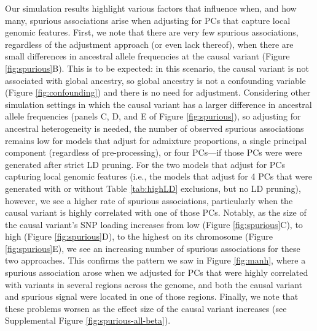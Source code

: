 \documentclass[12pt]{article}
\begin{document}
Our simulation results highlight various factors that influence when, and how many, spurious associations arise when adjusting for PCs that capture local genomic features.
First, we note that there are very few spurious associations, regardless of the adjustment approach (or even lack thereof), when there are small differences in ancestral allele frequencies at the causal variant (Figure \ref{fig:spurious}B). 
This is to be expected: in this scenario, the causal variant is not associated with global ancestry, so global ancestry is not a confounding variable (Figure \ref{fig:confounding}) and there is no need for adjustment.
Considering other simulation settings in which the causal variant has a larger difference in ancestral allele frequencies (panels C, D, and E of Figure \ref{fig:spurious}), so adjusting for ancestral heterogeneity is needed, the number of observed spurious associations remains low for models that adjust for admixture proportions, a single principal component (regardless of pre-processing), or four PCs---if those PCs were were generated after strict LD pruning.
For the two models that adjust for PCs capturing local genomic features (i.e., the models that adjust for 4 PCs that were generated with or without Table \ref{tab:highLD} exclusions, but no LD pruning), however, we see a higher rate of spurious associations, particularly when the causal variant is highly correlated with one of those PCs.
Notably, as the size of the causal variant's SNP loading increases from low (Figure \ref{fig:spurious}C), to high (Figure \ref{fig:spurious}D), to the highest on its chromosome (Figure \ref{fig:spurious}E), we see an increasing number of spurious associations for these two approaches.
This confirms the pattern we saw in Figure \ref{fig:manh}, where a spurious association arose when we adjusted for PCs that were highly correlated with variants in several regions across the genome, and both the causal variant and spurious signal were located in one of those regions. 
Finally, we note that these problems worsen as the effect size of the causal variant increases (see Supplemental Figure \ref{fig:spurious-all-beta}).
\end{document}
